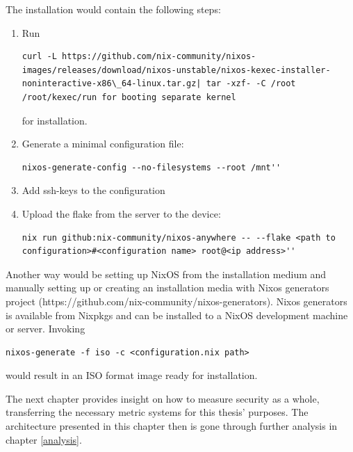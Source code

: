 The installation would contain the following steps:
\begin{enumerate}
\item Run
\begin{lstlisting}
curl -L https://github.com/nix-community/nixos-images/releases/download/nixos-unstable/nixos-kexec-installer-noninteractive-x86\_64-linux.tar.gz| tar -xzf- -C /root /root/kexec/run for booting separate kernel
\end{lstlisting}
for installation.
\item Generate a minimal configuration file:
\begin{lstlisting}
nixos-generate-config --no-filesystems --root /mnt''
\end{lstlisting}
\item Add ssh-keys to the configuration
\item Upload the flake from the server to the device:
\begin{lstlisting}
nix run github:nix-community/nixos-anywhere -- --flake <path to configuration>#<configuration name> root@<ip address>''
\end{lstlisting}
\end{enumerate}
Another way would be setting up NixOS from the installation medium and
manually setting up or creating an installation media with Nixos
generators project
(https://github.com/nix-community/nixos-generators). Nixos generators
is available from Nixpkgs and can be installed to a NixOS
development machine or server. Invoking
\begin{lstlisting}
nixos-generate -f iso -c <configuration.nix path>
\end{lstlisting}
would result in an ISO format image ready for
installation. \cite{githubGitHubNixcommunitynixosanywhere}

The next chapter provides insight on how to measure security as a
whole, transferring the necessary metric systems for this thesis'
purposes. The architecture presented in this chapter then is gone
through further analysis in chapter \ref{analysis}.
